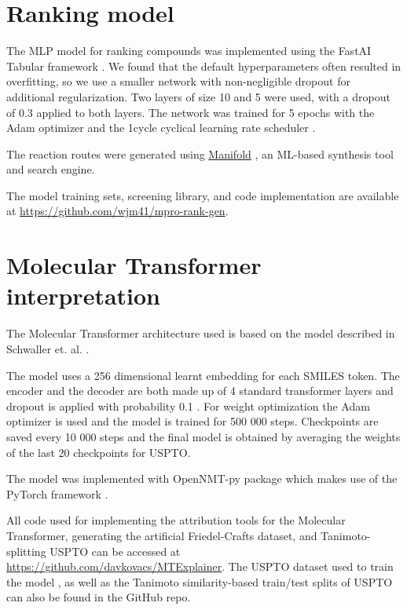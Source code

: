 \section{Ranking model} \label{appendix:ranking}

The MLP model for ranking compounds was implemented using the FastAI Tabular framework \cite{howard2018fastai}. We found that the default hyperparameters often resulted in overfitting, so we use a smaller network with non-negligible dropout for additional regularization. Two layers of size 10 and 5 were used, with a dropout of 0.3 applied to both layers. The network was trained for 5 epochs with the Adam optimizer \cite{Kingma2014Adam} and the 1cycle cyclical learning rate scheduler \cite{smith2018superconvergence}.

The reaction routes were generated using \href{https://app.postera.ai}{Manifold} \cite{PosteraManifold}, an ML-based synthesis tool and search engine.

The model training sets, screening library, and code implementation are available at \url{https://github.com/wjm41/mpro-rank-gen}.

\section{Molecular Transformer interpretation} \label{appendix:transformer}
The Molecular Transformer architecture used is based on the model described in Schwaller et. al. \cite{Schwaller2019MolecularPrediction}.

The model uses a 256 dimensional learnt embedding for each SMILES token. The encoder and the decoder are both made up of 4 standard transformer layers and dropout is applied with probability 0.1 \cite{Srivastava2014dropout}. For weight optimization the Adam optimizer is used and the model is trained for 500 000 steps. Checkpoints are saved every 10 000 steps and the final model is obtained by averaging the weights of the last 20 checkpoints for USPTO.

The model was implemented with OpenNMT-py package \cite{Klein2017} which makes use of the PyTorch framework \cite{paszke2019pytorch}.

All code used for implementing the attribution tools for the Molecular Transformer, generating the artificial Friedel-Crafts dataset, and Tanimoto-splitting USPTO can be accessed at \url{https://github.com/davkovacs/MTExplainer}. The USPTO dataset used to train the model \cite{Lowe2012, Jin2017}, as well as the Tanimoto similarity-based train/test splits of USPTO can also be found in the GitHub repo.

